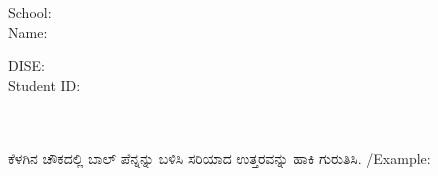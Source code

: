 \documentclass[12pt,
  english,
  oneside,
  pagemark,
  stamp,headheight=0cm]{sdaps}
\title{\-\vspace{1ex}\Large \textbf {\phantom {State Assessment Survey}}}
\begin{document}
\setlength{\checkboxsize}{3.5mm}
\begin{questionnaire}[noinfo]
  \vspace{-2ex}
  \hspace{2ex}
  \begin{minipage}{0.4\textwidth}
    School: \\[2ex]
    Name:
  \end{minipage}
  \begin{minipage}{0.6\textwidth}
    DISE:\\[2ex]
    Student ID:
  \end{minipage}\\[2ex]
  \hfill\\{\kannada ಕೆಳಗಿನ ಚೌಕದಲ್ಲಿ ಬಾಲ್ ಪೆನ್ನನ್ನು ಬಳಿಸಿ ಸರಿಯಾದ ಉತ್ತರವನ್ನು}{\large \checkmark} {\kannada ಹಾಕಿ ಗುರುತಿಸಿ.}
  /Example:\enspace\makebox[0pt][l]{$\square$}\raisebox{.15ex}{\hspace{0.1em}$\checkmark$}
  \begin{tcolorbox}[width=\textwidth,
      left=0pt,
      right=0pt,
      top=0pt,
      bottom=0pt,
      colback=white
    ]%
  \begin{minipage}{0.48\textwidth}
    \begin{minipage}{1.0\textwidth}
      \begin{choicegroup}{}
      \end{choicegroup}
    \end{minipage}
    \begin{minipage}{0.5\textwidth}
      \begin{choicegroup}{}
      \end{choicegroup}
    \end{minipage}\\[1ex]
    \begin{minipage}{0.8\textwidth}
      \begin{choicegroup}{}
      \end{choicegroup}
    \end{minipage}
  \end{minipage}
  \end{tcolorbox}
  \vspace{-1ex}
  \hspace{0.15cm}

\end{questionnaire}
\end{document}
